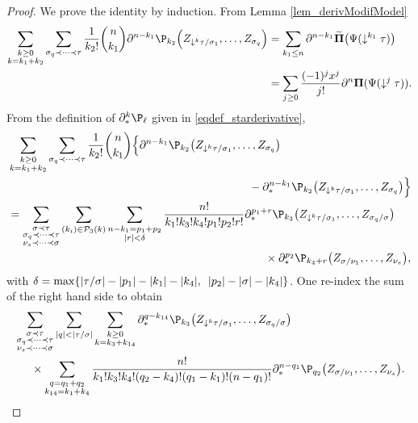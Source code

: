 \documentclass[11pt]{preprint}
\newcommand{\mcP}{\mathcal{P}}
\def\PPi{\boldsymbol{\Pi}}
\begin{document}
\begin{proof}
We prove the identity by induction. From Lemma \ref{lem_derivModifModel}
\begin{align*}
	\sum_{\substack{k\geq 0 \\ k=k_1+k_2}} \sum_{\sigma_q\prec\dots\prec\tau } \frac{1}{k_2!} \binom{n}{k_1}\partial^{n-k_1}\P_{k_2}\Big(  Z_{\downarrow^k\tau/\sigma_1},\dots, Z_{\sigma_q}   \Big) 
&=
	 \sum_{k_1\leq n}\partial^{n-k_1} \widetilde{ \PPi}\big( \Psi(\downarrow^{k_1}\tau) \big)
	 \\
	 &= \sum_{j\geq0} \frac{(-1)^jx^j}{j!} \partial^n \PPi(\Psi(\downarrow^j\tau)).
\end{align*}
From the definition of $\partial^k_*{\P}_\ell$ given in \ref{eqdef_starderivative}, 
\begin{align*}
	&\sum_{\substack{k\geq 0 \\ k=k_1+k_2}} \sum_{\sigma_q\prec\dots\prec\tau } \frac{1}{k_2!} \binom{n}{k_1}\Big\{ \partial^{n-k_1}\P_{k_2}\big(  Z_{\downarrow^k\tau/\sigma_1},\dots, Z_{\sigma_q}   \big) \\
	&\hspace{7.5cm}-\partial^{n-k_1}_*\P_{k_2}\big(  Z_{\downarrow^k\tau/\sigma_1},\dots, Z_{\sigma_q}   \big)\Big\} 
	\\
	&= \sum_{\substack{\sigma\prec\tau \\ \sigma_q\prec\dots\prec\tau \\ \nu_s\prec\dots\prec\sigma}} \sum_{(k_i)\in\mcP_3(k)}\sum_{\substack{n-k_1=p_1+p_2 \\ |r|< \delta }} \frac{n!}{k_1!k_3!k_4!p_1!p_2!r!}\partial^{p_1+r}_* \P_{k_3} \big(Z_{\downarrow^k\tau/\sigma_1},\dots,Z_{\sigma_q/\sigma}\big) 
	\\
	&\hspace{8cm}\times \partial^{p_2}_*\P_{k_4+r}\big(Z_{\sigma/\nu_1},\dots, Z_{\nu_s}   \big),
\end{align*}
with $\delta=\max\{ |\tau/\sigma| - |p_1|-|k_1|-|k_4|, \enskip |p_2|-|\sigma|-|k_4|\}$. One re-index the sum of the right hand side to obtain
\begin{align*}
	&\sum_{\substack{\sigma\prec\tau \\ \sigma_q\prec\dots\prec\tau \\ \nu_s\prec\dots\prec\sigma}} \sum_{|q|<|\tau/\sigma |} \sum_{\substack{k\geq 0 \\ k=k_3+k_{14}}} 
	\partial^{ q-k_{14}}_* \P_{k_3} \big(Z_{\downarrow^k\tau/\sigma_1},\dots,Z_{\sigma_q/\sigma}\big) 
	\\
	&\hspace{0.5cm}\times \sum_{\substack{q=q_1+q_2 \\ k_{14}=k_1+k_4 }} \frac{n!}{k_1!k_3!k_4!(q_2-k_4)!(q_1-k_1)!(n-q_1)! } \partial^{n-q_1}_*\P_{q_2}\big(Z_{\sigma/\nu_1},\dots, Z_{\nu_s}   \big).

\end{align*}
\end{proof}
\end{document}
